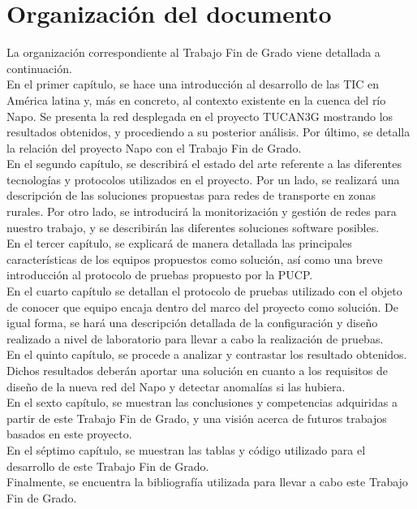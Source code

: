 \section{Organización del documento}
	La organización correspondiente al Trabajo Fin de Grado viene detallada a continuación.\\
	
	En el primer capítulo, se hace una introducción al desarrollo de las TIC en América latina y, más en concreto, al contexto existente en la cuenca del río Napo. Se presenta la red desplegada en el proyecto TUCAN3G mostrando los resultados obtenidos, y procediendo a su posterior análisis. Por último, se detalla la relación del proyecto Napo con el Trabajo Fin de Grado.\\
	
	En el segundo capítulo, se describirá el estado del arte referente a las diferentes tecnologías y protocolos utilizados en el proyecto. Por un lado, se realizará una descripción de las soluciones propuestas para redes de transporte en zonas rurales. Por otro lado, se introducirá la monitorización y gestión de redes para nuestro trabajo, y se describirán las diferentes soluciones software posibles.\\
	
	En el tercer capítulo, se explicará de manera detallada las principales características de los equipos propuestos como solución, así como una breve introducción al protocolo de pruebas propuesto por la PUCP.\\
	
	En el cuarto capítulo se detallan el protocolo de pruebas utilizado con el objeto de conocer que equipo encaja dentro del marco del proyecto como solución. De igual forma, se hará una descripción detallada de la configuración y diseño realizado a nivel de laboratorio para llevar a cabo la realización de pruebas.\\
	
	En el quinto capítulo, se procede a analizar y contrastar los resultado obtenidos. Dichos resultados deberán aportar una solución en cuanto a los requisitos de diseño de la nueva red del Napo y detectar anomalías si las hubiera.\\
	
	En el sexto capítulo, se muestran las conclusiones y competencias adquiridas a partir de este Trabajo Fin de Grado, y una visión acerca de futuros trabajos basados en este proyecto.\\
	
	En el séptimo capítulo, se muestran las tablas y código utilizado para el desarrollo de este Trabajo Fin de Grado.\\
	
	Finalmente, se encuentra la bibliografía utilizada para llevar a cabo este Trabajo Fin de Grado.
